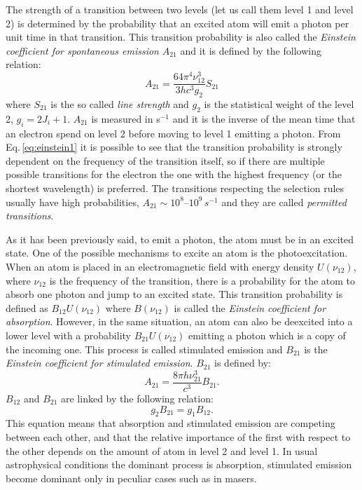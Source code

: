 \documentclass[../main.tex]{subfiles}
\begin{document}
The strength of a transition between two levels (let us call them level 1 and level 2) is determined by the probability that an excited atom will emit a photon per unit time in that transition.
This transition probability is also called the \emph{Einstein coefficient for spontaneous emission} $A_{21}$ and it is defined by the following relation:
\begin{equation}
    \label{eq:einstein1}
    A_{21} = \frac{64\pi^{4}\nu_{12}^3}{3hc^3g_2}S_{21}
\end{equation}
where $S_{21}$ is the so called \emph{line strength} and $g_2$ is the statistical weight of the level 2, $g_i = 2J_i+1$.
$A_{21}$ is measured in s$^{-1}$ and it is the inverse of the mean time that an electron spend on level 2 before moving to level 1 emitting a photon.
From Eq.\,\ref{eq:einstein1} it is possible to see that the transition probability is strongly dependent on the frequency of the transition itself, so if there are multiple possible transitions for the electron the one with the highest frequency (or the shortest wavelength) is preferred.
The transitions respecting the selection rules usually have high probabilities, $A_{21}\sim 10^8$--$10^9\,\si{s^{-1}}$ and they are called \emph{permitted transitions}.

As it has been previously said, to emit a photon, the atom must be in an excited state.
One of the possible mechanisms to excite an atom is the photoexcitation.
When an atom is placed in an electromagnetic field with energy density $U(\nu_{12})$, where $\nu_{12}$ is the frequency of the transition, there is a probability for the atom to absorb one photon and jump to an excited state.
This transition probability is defined as $B_{12}U(\nu_{12})$ where $B(\nu_{12})$ is called the \emph{Einstein coefficient for absorption}.
However, in the same situation, an atom can also be deexcited into a lower level with a probability $B_{21}U(\nu_{12})$ emitting a photon which is a copy of the incoming one.
This process is called stimulated emission and $B_{21}$ is the \emph{Einstein coefficient for stimulated emission}.
$B_{21}$ is defined by:
\begin{equation}
    \label{eq:einstein2}
    A_{21} = \frac{8\pi h\nu_{21}^3}{c^3} B_{21}.
\end{equation}
$B_{12}$ and $B_{21}$ are linked by the following relation:
\begin{equation}
    \label{eq:einstein3}
    g_2B_{21} = g_1B_{12}.
\end{equation}
This equation means that absorption and stimulated emission are competing between each other, and that the relative importance of the first with respect to the other depends on the amount of atom in level 2 and level 1.
In usual astrophysical conditions the dominant process is absorption, stimulated emission become dominant only in peculiar cases such as in masers. 
\end{document}
